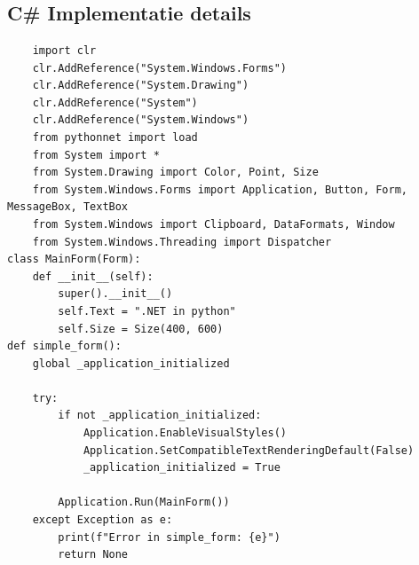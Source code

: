 \chapter{}
\label{ch:codefragmenten}
\section{C\# Implementatie details}
\label{app:csharp_setup}
  
\begin{listing}
	\begin{verbatim}
    import clr
    clr.AddReference("System.Windows.Forms")
    clr.AddReference("System.Drawing")
    clr.AddReference("System")
    clr.AddReference("System.Windows")
    from pythonnet import load
    from System import *
    from System.Drawing import Color, Point, Size
    from System.Windows.Forms import Application, Button, Form, MessageBox, TextBox
    from System.Windows import Clipboard, DataFormats, Window
    from System.Windows.Threading import Dispatcher
class MainForm(Form):
    def __init__(self):
        super().__init__()
        self.Text = ".NET in python"
        self.Size = Size(400, 600)
def simple_form():
    global _application_initialized

    try:
        if not _application_initialized:
            Application.EnableVisualStyles()
            Application.SetCompatibleTextRenderingDefault(False)
            _application_initialized = True

        Application.Run(MainForm())
    except Exception as e:
        print(f"Error in simple_form: {e}")
        return None


  \end{verbatim}
	\caption[pythonnet codefragment]{Codefragment gemaakt als voorbeeld}
  \label{lst:winformdemo}
\end{listing}


